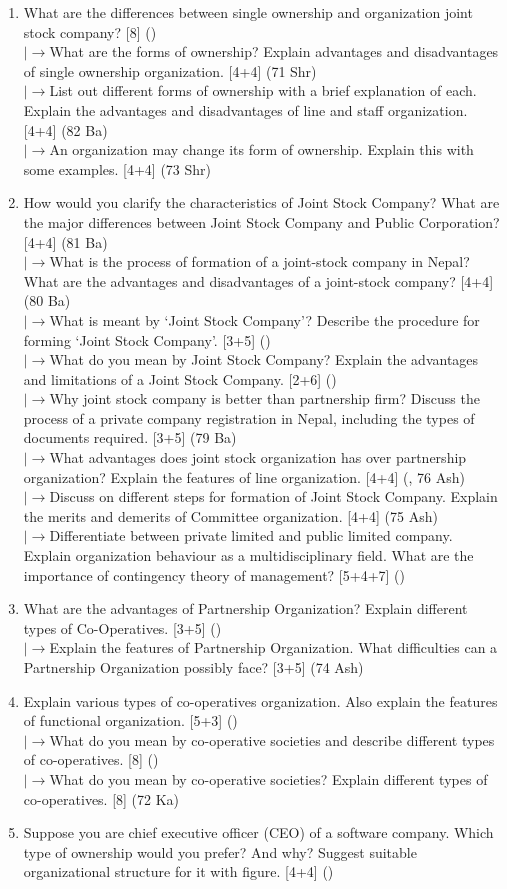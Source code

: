 \documentclass[12pt]{article}
\newcommand{\lb}{\\$\left|\rightarrow\right.$}
\begin{document}
    \begin{enumerate}[topsep=0pt, noitemsep]
      \item What are the differences between single ownership and organization joint stock company? \hfill [8] ()
        \lb What are the forms of ownership? Explain advantages and disadvantages of single ownership organization. \hfill [4+4] (71 Shr)
        \lb List out different forms of ownership with a brief explanation of each. Explain the advantages and disadvantages of line and staff organization. \hfill [4+4] (82 Ba)
        \lb An organization may change its form of ownership. Explain this with some examples. \hfill [4+4] (73 Shr)

      \item How would you clarify the characteristics of Joint Stock Company? What are the major differences between Joint Stock Company and Public Corporation? \hfill [4+4] (81 Ba)
        \lb What is the process of formation of a joint-stock company in Nepal? What are the advantages and disadvantages of a joint-stock company? \hfill [4+4] (80 Ba)
        \lb What is meant by `Joint Stock Company'? Describe the procedure for forming `Joint Stock Company'. \hfill [3+5] ()
        \lb What do you mean by Joint Stock Company? Explain the advantages and limitations of a Joint Stock Company. \hfill [2+6] ()
        \lb Why joint stock company is better than partnership firm? Discuss the process of a private company registration in Nepal, including the types of documents required. \hfill [3+5] (79 Ba)
        \lb What advantages does joint stock organization has over partnership organization? Explain the features of line organization. \hfill [4+4] (, 76 Ash)
        \lb Discuss on different steps for formation of Joint Stock Company. Explain the merits and demerits of Committee organization. \hfill [4+4] (75 Ash)
        \lb Differentiate between private limited and public limited company. Explain organization behaviour as a multidisciplinary field. What are the importance of contingency theory of management? \hfill [5+4+7] ()

      \item What are the advantages of Partnership Organization? Explain different types of Co-Operatives. \hfill [3+5] ()
        \lb Explain the features of Partnership Organization. What difficulties can a Partnership Organization possibly face? \hfill [3+5] (74 Ash)

      \item Explain various types of co-operatives organization. Also explain the features of functional organization. \hfill [5+3] ()
        \lb What do you mean by co-operative societies and describe different types of co-operatives. \hfill [8] ()
        \lb What do you mean by co-operative societies? Explain different types of co-operatives. \hfill [8] (72 Ka)

      \item Suppose you are chief executive officer (CEO) of a software company. Which type of ownership would you prefer? And why? Suggest suitable organizational structure for it with figure. \hfill [4+4] ()
    \end{enumerate}
\end{document}
